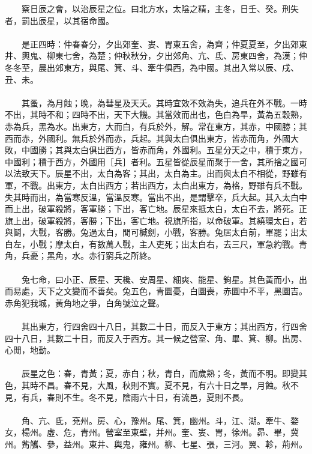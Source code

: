 　　察日辰之會，以治辰星之位。曰北方水，太陰之精，主冬，日壬、癸。刑失者，罰出辰星，以其宿命國。
\\\\
　　是正四時：仲春春分，夕出郊奎、婁、胃東五舍，為齊；仲夏夏至，夕出郊東井、輿鬼、柳東七舍，為楚；仲秋秋分，夕出郊角、亢、氐、房東四舍，為漢；仲冬冬至，晨出郊東方，與尾、箕、斗、牽牛俱西，為中國。其出入常以辰、戌、丑、未。
\\\\
　　其蚤，為月蝕；晚，為彗星及天夭。其時宜效不效為失，追兵在外不戰。一時不出，其時不和；四時不出，天下大饑。其當效而出也，色白為旱，黃為五穀熟，赤為兵，黑為水。出東方，大而白，有兵於外，解。常在東方，其赤，中國勝；其西而赤，外國利。無兵於外而赤，兵起。其與太白俱出東方，皆赤而角，外國大敗，中國勝；其與太白俱出西方，皆赤而角，外國利。五星分天之中，積于東方，中國利；積于西方，外國用［兵］者利。五星皆從辰星而聚于一舍，其所捨之國可以法致天下。辰星不出，太白為客；其出，太白為主。出而與太白不相從，野雖有軍，不戰。出東方，太白出西方；若出西方，太白出東方，為格，野雖有兵不戰。失其時而出，為當寒反溫，當溫反寒。當出不出，是謂擊卒，兵大起。其入太白中而上出，破軍殺將，客軍勝；下出，客亡地。辰星來抵太白，太白不去，將死。正旗上出，破軍殺將，客勝；下出，客亡地。視旗所指，以命破軍。其繞環太白，若與鬬，大戰，客勝。兔過太白，閒可椷劍，小戰，客勝。兔居太白前，軍罷；出太白左，小戰；摩太白，有數萬人戰，主人吏死；出太白右，去三尺，軍急約戰。青角，兵憂；黑角，水。赤行窮兵之所終。
\\\\
　　兔七命，曰小正、辰星、天欃、安周星、細爽、能星、鉤星。其色黃而小，出而易處，天下之文變而不善矣。兔五色，青圜憂，白圜喪，赤圜中不平，黑圜吉。赤角犯我城，黃角地之爭，白角號泣之聲。
\\\\
　　其出東方，行四舍四十八日，其數二十日，而反入于東方；其出西方，行四舍四十八日，其數二十日，而反入于西方。其一候之營室、角、畢、箕、柳。出房、心閒，地動。
\\\\
　　辰星之色：春，青黃；夏，赤白；秋，青白，而歲熟；冬，黃而不明。即變其色，其時不昌。春不見，大風，秋則不實。夏不見，有六十日之旱，月蝕。秋不見，有兵，春則不生。冬不見，陰雨六十日，有流邑，夏則不長。
\\\\
　　角、亢、氐，兗州。房、心，豫州。尾、箕，幽州。斗，江、湖。牽牛、婺女，楊州。虛、危，青州。營室至東壁，并州。奎、婁、胃，徐州。昴、畢，冀州。觜觿、參，益州。東井、輿鬼，雍州。柳、七星、張，三河。翼、軫，荊州。
\\\\

